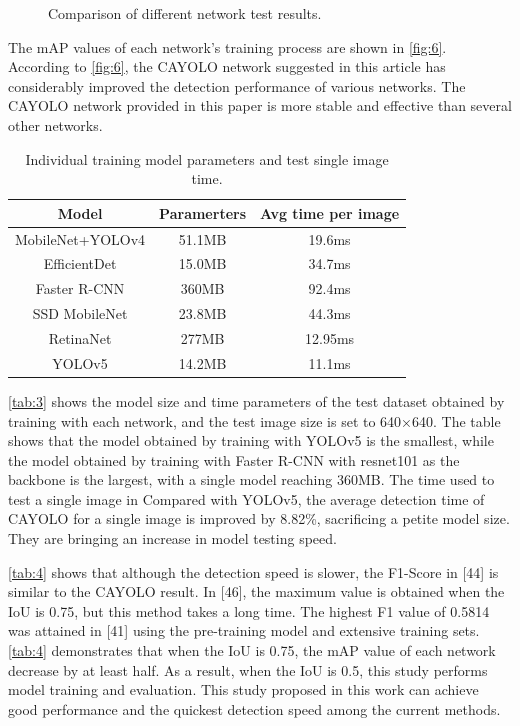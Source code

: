 \documentclass[sensors,article,submit,moreauthors]{Definitions/mdpi}
\begin{document}
\begin{figure}[H]
        \caption{Comparison of different network test results.\label{fig:9}}
    \end{figure}

    The mAP values of each network's training process are shown in \autoref{fig:6}. According to \autoref{fig:6}, the CAYOLO network suggested in this article has considerably improved the detection performance of various networks. The CAYOLO network provided in this paper is more stable and effective than several other networks.

    \begin{table}[H]
        \caption{Individual training model parameters and test single image time.\label{tab:3}}
        \begin{tabularx}{\textwidth}{CCC}
            \toprule
            \textbf{Model}   & \textbf{Paramerters} & \textbf{Avg time per image} \\
            \midrule
            MobileNet+YOLOv4 & 51.1MB               & 19.6ms                      \\
            EfficientDet     & 15.0MB               & 34.7ms                      \\
            Faster R-CNN     & 360MB                & 92.4ms                      \\
            SSD MobileNet    & 23.8MB               & 44.3ms                      \\
            RetinaNet        & 277MB                & 12.95ms                     \\
            YOLOv5           & 14.2MB               & 11.1ms                      \\
            \bottomrule
        \end{tabularx}
    \end{table}


    \autoref{tab:3} shows the model size and time parameters of the test dataset obtained by training with each network, and the test image size is set to 640×640. The table shows that the model obtained by training with YOLOv5 is the smallest, while the model obtained by training with Faster R-CNN with resnet101 as the backbone is the largest, with a single model reaching 360MB. The time used to test a single image in Compared with YOLOv5, the average detection time of CAYOLO for a single image is improved by 8.82\%, sacrificing a petite model size. They are bringing an increase in model testing speed.

    \autoref{tab:4} shows that although the detection speed is slower, the F1-Score in [44] is similar to the CAYOLO result. In [46], the maximum value is obtained when the IoU is 0.75, but this method takes a long time. The highest F1 value of 0.5814 was attained in [41] using the pre-training model and extensive training sets. \autoref{tab:4} demonstrates that when the IoU is 0.75, the mAP value of each network decrease by at least half. As a result, when the IoU is 0.5, this study performs model training and evaluation. This study proposed in this work can achieve good performance and the quickest detection speed among the current methods.
\end{document}
